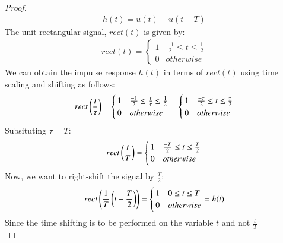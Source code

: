 \documentclass[journal,12pt,twocolumn]{IEEEtran}
\begin{document}
\begin{proof}
\begin{align}
    h(t) = u(t) - u(t-T)
\end{align}
The unit rectangular signal, $rect(t)$ is given by:
\begin{align}
    rect(t) = 
    \begin{cases}
    1 & \frac{-1}{2} \leq t \leq \frac{1}{2} \\
    0 & otherwise
    \end{cases}
    \label{rect}
\end{align}
We can obtain the impulse response $h(t)$ in terms of $rect(t)$ using time scaling and shifting as follows:
\begin{align}
    rect\left(\frac{t}{\tau}\right) = 
    \begin{cases}
    1 & \frac{-1}{2} \leq \frac{t}{\tau} \leq  \frac{1}{2}\\
    0 & otherwise
    \end{cases}
     = 
     \begin{cases}
     1 & \frac{-\tau}{2} \leq t \leq  \frac{\tau}{2}\\
    0 & otherwise
     \end{cases}
    \end{align}
    Subsituting $\tau = T$:
    \begin{align}
    rect\left(\frac{t}{T}\right) = 
    \begin{cases}
    1 & \frac{-T}{2} \leq t \leq \frac{T}{2}\\
    0 & otherwise
    \end{cases}
    \end{align}
    Now, we want to right-shift the signal by $\frac{T}{2}$:
    \begin{align}
    rect\left(\frac{1}{T}\left(t - \frac{T}{2}\right)\right) = 
    \begin{cases}
    1 &  0 \leq t \leq T\\
    0 & otherwise
    \end{cases}
     = h(t)
\end{align}
Since the time shifting is to be performed on the variable $t$ and not $\frac{t}{T}$\\


\end{proof}
\end{document}
